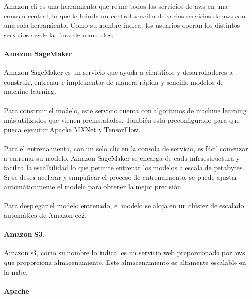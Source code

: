 \documentclass[12pt, a4paper, titlepage]{report}
\begin{document}
			Amazon \acrfull{cli} es una herramienta que reúne todos los servicios de \acrshort{aws} en una consola central, lo que le brinda un control sencillo de varios servicios de \acrshort{aws} con una sola herramienta. Como su nombre indica, los usuarios operan los distintos servicios desde la línea de comandos. 
			
			\paragraph{Amazon SageMaker \\}
			Amazon SageMaker es un servicio que ayuda a científicos y desarrolladores a construir, entrenar e implementar de manera rápida y sencilla modelos de machine learning.\\\\
			Para construir el modelo, este servicio cuenta con algoritmos de machine learning más utilizados que vienen preinstalados. También está preconfigurado para que pueda ejecutar Apache MXNet y TensorFlow.\\\\
			Para el entrenamiento, con un solo clic en la consola de servicio, es fácil comenzar a entrenar su modelo. Amazon SageMaker se encarga de cada infraestructura y facilita la escalbilidad lo que permite entrenar los modelos a escala de petabytes. Si se desea acelerar y simplificar el proceso de entrenamiento, se puede ajustar automáticamente el modelo para obtener la mejor precisión.\\\\
			Para desplegar el modelo entrenado, el modelo se aloja en un clúster de escalado automático de Amazon \acrshort{ec2}.		
			\newpage	
			\paragraph{Amazon S3. \\}
			Amazon \acrfull{s3}, como su nombre lo indica, es un servicio web proporcionado por \acrfull{aws} que proporciona almacenamiento. Este almacenamiento es altamente escalable en la nube. 
			
			\paragraph{Apache \\}
					
\end{document}
